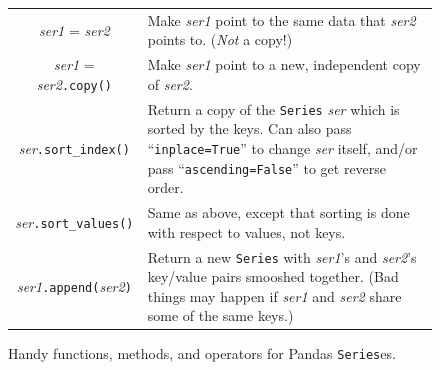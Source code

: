 \begin{figure}[ht]
\begin{tabular}{c|p{2.9in}}
\textsl{ser1} = \textsl{ser2} & Make \textsl{ser1} point to the same data that
\textsl{ser2} points to. (\textit{Not} a copy!)\\

\textsl{ser1} = \textsl{ser2}\texttt{.copy()} & Make \textsl{ser1} point to a
new, independent copy of \textsl{ser2}. \\

\textsl{ser}\texttt{.sort\_index()} & Return a copy of the \texttt{Series}
\textsl{ser} which is sorted by the keys. Can also pass
``\texttt{inplace=True}'' to change \textsl{ser} itself, and/or pass
``\texttt{ascending=False}'' to get reverse order. \\

\textsl{ser}\texttt{.sort\_values()} & Same as above, except that sorting is
done with respect to values, not keys. \\

\textsl{ser1}\texttt{.append(}\textsl{ser2}\texttt{)} & 
Return a new \texttt{Series} with \textsl{ser1}'s and \textsl{ser2}'s key/value
pairs smooshed together. (Bad things may happen if \textsl{ser1} and
\textsl{ser2} share some of the same keys.) \\

\end{tabular}\par
\endgroup
\bigskip
\caption{Handy functions, methods, and operators for Pandas \texttt{Series}es.}
\label{fig:handySeries}
\end{figure}

